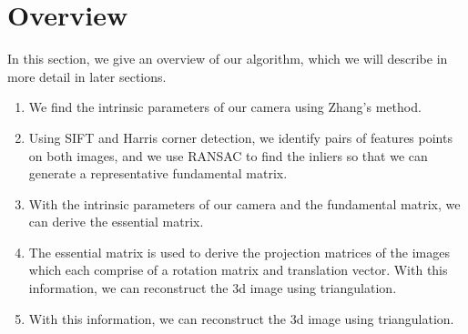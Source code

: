 \section{Overview}
\label{s:overview}

In this section, we give an overview of our algorithm, which we will describe in more detail
in later sections.

\begin{enumerate}
\item{We find the intrinsic parameters of our camera using Zhang's method.}
\item{Using SIFT and Harris corner detection, we identify pairs of features points on both images, and we use RANSAC to find the inliers so that we can generate a representative fundamental matrix.}
\item{With the intrinsic parameters of our camera and the fundamental matrix, we can derive the essential matrix.}
\item{The essential matrix is used to derive the projection matrices of the images which each comprise of a rotation matrix and translation vector. With this information, we can reconstruct the 3d image using triangulation.}
\item{With this information, we can reconstruct the 3d image using triangulation.}
\end{enumerate}
